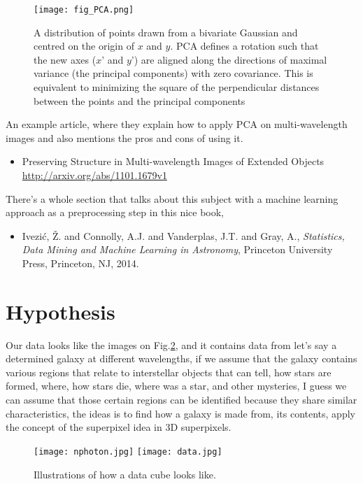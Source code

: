 \documentclass[11pt,fleqn]{book} %
\begin{document}
\begin{figure}[h]
    \centering
    \texttt{[image: fig\_PCA.png]}
    \caption{A distribution of points drawn from a bivariate Gaussian and centred on the origin of $x$ and $y$. PCA defines a rotation such that the new axes ($x’$ and $y’$) are aligned along the directions of maximal variance (the principal components) with zero covariance. This is equivalent to minimizing the square of the perpendicular distances between the points and the principal components}
    \label{fig:pca}
\end{figure}

\begin{remark}
	An example article, where they explain how to apply PCA on multi-wavelength images and also mentions the pros and cons of using it.
    \begin{itemize}
    	\item Preserving Structure in Multi-wavelength Images of Extended Objects\\ \url{http://arxiv.org/abs/1101.1679v1}
    \end{itemize}
    There's a whole section that talks about this subject with a machine learning approach as a preprocessing step in this nice book,
    \begin{itemize}
    	\item Ivezi{\'c}, \v Z. and Connolly, A.J.
         and Vanderplas, J.T. and Gray, A., \textit{Statistics, Data Mining and Machine Learning in Astronomy}, Princeton University Press, Princeton, NJ, 2014.
    \end{itemize}
\end{remark}

\section{Hypothesis}
Our data looks like the images on Fig.\ref{fig:cubes}, and it contains data from let's say a determined galaxy at different wavelengths, if we assume that the galaxy contains various regions that relate to interstellar objects that can tell, how stars are formed, where, how stars die, where was a star, and other mysteries, I guess we can assume that those certain regions can be identified because they share similar characteristics, the ideas is to find how a galaxy is made from, its contents, apply the concept of the superpixel idea in 3D superpixels. 
\begin{figure}[h]
	\centering
    \texttt{[image: nphoton.jpg]}\hspace{1cm}
    \texttt{[image: data.jpg]}
    \caption{Illustrations of how a data cube looks like.}
    \label{fig:cubes}
\end{figure}
\end{document}
